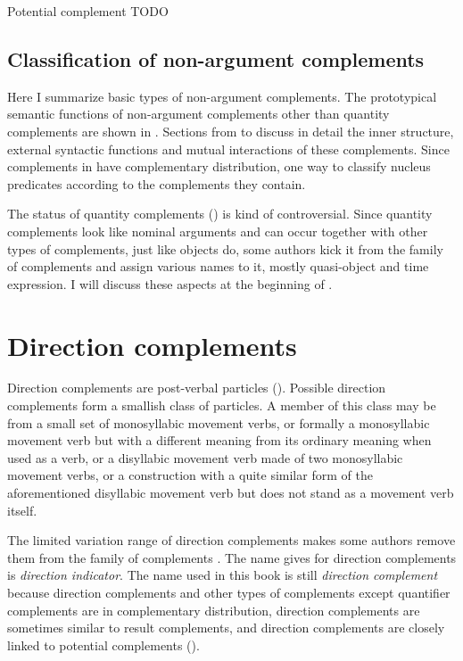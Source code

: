 \documentclass[../main.tex]{subfiles}
\begin{document}
Potential complement TODO

\subsection{Classification of non-argument complements}\label{sec:complement-classification}

Here I summarize basic types of non-argument complements. The prototypical semantic functions of 
non-argument complements other than quantity complements are shown in .
Sections from  to  discuss in 
detail the inner structure, external syntactic functions and mutual interactions of these 
complements. Since complements in  have complementary distribution,
one way to classify nucleus predicates according to the complements they contain. 

The status of quantity complements () is kind of controversial.
Since quantity complements look like nominal arguments and can occur together with other types of 
complements, just like objects do, some authors kick it from the family of complements and 
assign various names to it, mostly quasi-object and time expression. I will discuss these aspects 
at the beginning of .



\section{Direction complements}\label{sec:direction-complement}

Direction complements are post-verbal particles ().
Possible direction complements form a smallish class of particles.
A member of this class may be from a small set of monosyllabic movement verbs, %
or formally a monosyllabic movement verb but with a different meaning %
from its ordinary meaning when used as a verb, 
or a disyllabic movement verb made of two monosyllabic movement verbs,
or a construction with a quite similar form of the aforementioned disyllabic movement verb 
but does not stand as a movement verb itself. 

The limited variation range of direction complements makes 
some authors remove them from the family of complements \citep[]{po2015chinese}.
The name \citet{po2015chinese} gives for direction complements is \emph{direction indicator}.
The name used in this book is still \emph{direction complement} because 
direction complements and other types of complements except quantifier complements 
are in complementary distribution, 
direction complements are sometimes similar to result complements, %
and direction complements are closely linked to potential complements 
().
\end{document}
